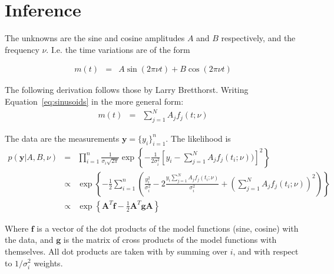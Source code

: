 \documentclass[a4paper, 10pt]{article}
\title{}
\author{Me}
\date{\today}
\begin{document}
\maketitle


\section{Inference}
The unknowns are the sine and cosine amplitudes $A$ and $B$ respectively,
and the frequency $\nu$. I.e. the time variations are of the form

\begin{eqnarray}
m(t) &=& A\sin(2\pi\nu t) + B\cos(2\pi\nu t)\label{eq:sinusoids}
\end{eqnarray}

The following derivation follows those by Larry Bretthorst. Writing
Equation~\ref{eq:sinusoids} in the more general form:
\begin{eqnarray}
m(t) &=& \sum_{j=1}^N A_j f_j(t; \nu)\label{eq:sinusoids}
\end{eqnarray}

The data are the measurements
$\mathbf{y} = \{y_i\}_{i=1}^n$.
The likelihood is
\begin{eqnarray}
p(\mathbf{y} | A, B, \nu)
&=&
\prod_{i=1}^{n} \frac{1}{\sigma_i \sqrt{2\pi}}
\exp\left\{
-\frac{1}{2\sigma_i^2}
\left[y_i - \sum_{j=1}^N A_j f_j(t_i; \nu))\right]^2
\right\}
\\
&\propto&
\exp\left\{
-\frac{1}{2}\sum_{i=1}^n
\left(
\frac{y_i^2}{\sigma_i^2} - 2\frac{y_i \sum_{j=1}^N A_j f_j(t_i; \nu)}{\sigma_i^2}
+ \left(\sum_{j=1}^N A_j f_j(t_i; \nu)\right)^2
\right)
\right\}\nonumber\\
&\propto&
\exp\left\{
\mathbf{A}^T\mathbf{f}
 -\frac{1}{2} \mathbf{A}^T\mathbf{g}\mathbf{A}
\right\}
\end{eqnarray}

Where $\mathbf{f}$ is a vector of the dot products of the model functions
(sine, cosine) with the data, and $\mathbf{g}$ is the matrix of cross products
of the model functions with themselves. All dot products are taken with
by summing over $i$, and with respect to $1/\sigma_i^2$ weights.
\end{document}

